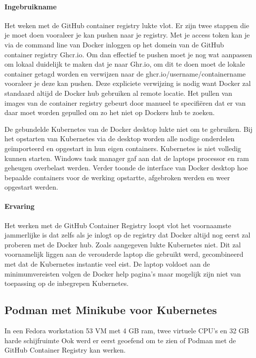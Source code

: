\paragraph{Ingebruikname}
Het weken met de GitHub container registry lukte vlot. Er zijn twee stappen die je moet doen vooraleer je kan pushen naar je registry. Met je access token kan je via de command line van Docker inloggen op het domein van de GitHub container registry Ghcr.io. Om dan effectief te pushen moet je nog wat aanpassen om lokaal duidelijk te maken dat je naar Ghr.io, om dit te doen moet de lokale container getagd worden en verwijzen naar de ghcr.io/username/containername vooraleer je deze kan pushen. Deze expliciete verwijzing is nodig want Docker zal standaard altijd de Docker hub gebruiken al remote locatie. Het pullen van images van de container registry gebeurt door manueel te specifiëren dat er van daar moet worden gepulled om zo het niet op Dockers hub te zoeken.

De gebundelde Kubernetes van de Docker desktop lukte niet om te gebruiken. Bij het opstarten van Kubernetes via de desktop worden alle nodige onderdelen geïmporteerd en opgestart in hun eigen containers. Kubernetes is niet volledig kunnen starten. Windows task manager gaf aan dat de laptops processor en ram geheugen overbelast werden. Verder toonde de interface van Docker desktop hoe bepaalde containers voor de werking opstartte, afgebroken werden en weer opgestart werden.

\paragraph{Ervaring}
Het werken met de GitHub Container Registry loopt vlot het voornaamste jammerlijke is dat zelfs als je inlogt op de registry dat Docker altijd nog eerst zal proberen met de Docker hub.
Zoals aangegeven lukte Kubernetes niet. Dit zal voornamelijk liggen aan de verouderde laptop die gebruikt werd, gecombineerd met dat de Kubernetes instantie veel eist. De laptop voldoet aan de minimumvereisten volgen de Docker help pagina’s maar mogelijk zijn niet van toepassing op de inbegrepen Kubernetes.  


\subsection{Podman met Minikube voor Kubernetes}
In een Fedora workstation 53 VM met 4 GB ram, twee virtuele CPU’s en 32 GB harde schijfruimte Ook werd er eerst geoefend om te zien of Podman met de GitHub Container Registry kan werken.

